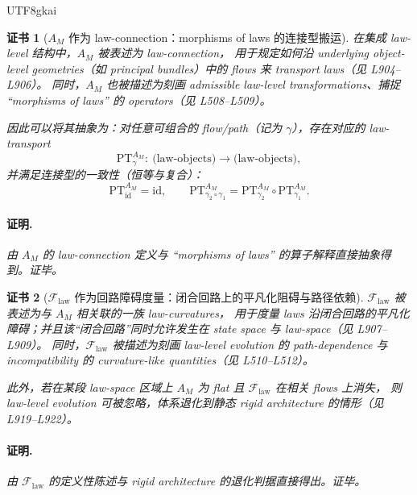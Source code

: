 \documentclass[12pt]{article}
\newtheorem{Certificate}{证书}[section]
\newcommand{\GZLOC}{\ensuremath{A_M}}
\newcommand{\GZLCurv}{\ensuremath{\mathcal{F}_{\mathrm{law}}}}
\begin{document}
\begin{CJK*}{UTF8}{gkai}
\begin{Certificate}[$\GZLOC$ 作为 law-connection：morphisms of laws 的连接型搬运]
\label{cert:tex18-ch2-gzloc-law-connection}
在集成 law-level 结构中，$\GZLOC$ 被表述为 law-connection，
用于规定如何沿 underlying object-level geometries（如 principal bundles）中的 flows 来 transport laws（见 L904--L906）。
同时，$\GZLOC$ 也被描述为刻画 admissible law-level transformations、捕捉 ``morphisms of laws'' 的 operators（见 L508--L509）。

因此可以将其抽象为：对任意可组合的 flow/path（记为 $\gamma$），存在对应的 law-transport
\[
  \mathrm{PT}^{\GZLOC}_\gamma:\ \text{(law-objects)}\to \text{(law-objects)},
\]
并满足连接型的一致性（恒等与复合）：
\[
  \mathrm{PT}^{\GZLOC}_{\mathrm{id}}=\mathrm{id},\qquad
  \mathrm{PT}^{\GZLOC}_{\gamma_2\circ \gamma_1}
  =\mathrm{PT}^{\GZLOC}_{\gamma_2}\circ \mathrm{PT}^{\GZLOC}_{\gamma_1}.
\]
\paragraph{证明.}
由 $\GZLOC$ 的 law-connection 定义与 ``morphisms of laws'' 的算子解释直接抽象得到。证毕。
\end{Certificate}

\begin{Certificate}[$\GZLCurv$ 作为回路障碍度量：闭合回路上的平凡化阻碍与路径依赖]
\label{cert:tex18-ch2-gzlcurv-loop-obstruction}
$\GZLCurv$ 被表述为与 $\GZLOC$ 相关联的一族 law-curvatures，
用于度量 laws 沿闭合回路的平凡化障碍；并且该“闭合回路”同时允许发生在 state space 与 law-space（见 L907--L909）。
同时，$\GZLCurv$ 被描述为刻画 law-level evolution 的 path-dependence 与 incompatibility 的 curvature-like quantities（见 L510--L512）。

此外，若在某段 law-space 区域上 $\GZLOC$ 为 flat 且 $\GZLCurv$ 在相关 flows 上消失，
则 law-level evolution 可被忽略，体系退化到静态 rigid architecture 的情形（见 L919--L922）。
\paragraph{证明.}
由 $\GZLCurv$ 的定义性陈述与 rigid architecture 的退化判据直接得出。证毕。
\end{Certificate}

\clearpage


\end{CJK*}
\end{document}
